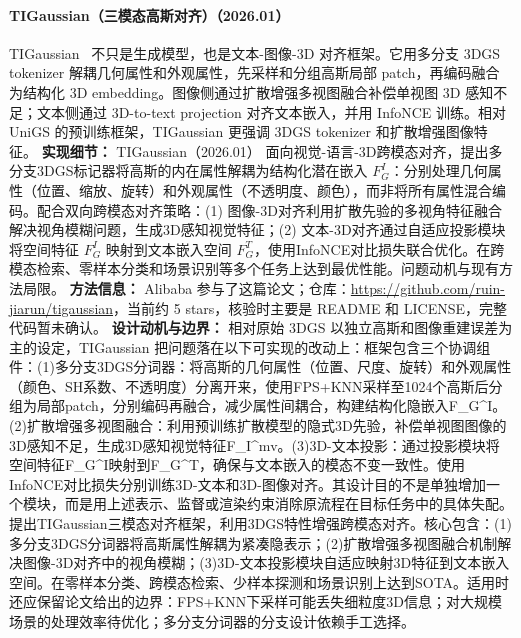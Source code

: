 \paragraph{TIGaussian（三模态高斯对齐）（2026.01）}
TIGaussian~\cite{2601_19247} 不只是生成模型，也是文本-图像-3D 对齐框架。它用多分支 3DGS tokenizer 解耦几何属性和外观属性，先采样和分组高斯局部 patch，再编码融合为结构化 3D embedding。图像侧通过扩散增强多视图融合补偿单视图 3D 感知不足；文本侧通过 3D-to-text projection 对齐文本嵌入，并用 InfoNCE 训练。相对 UniGS 的预训练框架，TIGaussian 更强调 3DGS tokenizer 和扩散增强图像特征。
\textbf{实现细节：} TIGaussian（2026.01） 面向视觉-语言-3D跨模态对齐，提出多分支3DGS标记器将高斯的内在属性解耦为结构化潜在嵌入 $F_G^I$：分别处理几何属性（位置、缩放、旋转）和外观属性（不透明度、颜色），而非将所有属性混合编码。配合双向跨模态对齐策略：(1) 图像-3D对齐利用扩散先验的多视角特征融合解决视角模糊问题，生成3D感知视觉特征；(2) 文本-3D对齐通过自适应投影模块将空间特征 $F_G^I$ 映射到文本嵌入空间 $F_G^T$，使用InfoNCE对比损失联合优化。在跨模态检索、零样本分类和场景识别等多个任务上达到最优性能。问题动机与现有方法局限。
\textbf{方法信息：} Alibaba 参与了这篇论文；仓库：\url{https://github.com/ruin-jiarun/tigaussian}，当前约 5 stars，核验时主要是 README 和 LICENSE，完整代码暂未确认。
\textbf{设计动机与边界：} 相对原始 3DGS 以独立高斯和图像重建误差为主的设定，TIGaussian 把问题落在以下可实现的改动上：框架包含三个协调组件：(1)多分支3DGS分词器：将高斯的几何属性（位置、尺度、旋转）和外观属性（颜色、SH系数、不透明度）分离开来，使用FPS+KNN采样至1024个高斯后分组为局部patch，分别编码再融合，减少属性间耦合，构建结构化隐嵌入F\_G\^{}I。(2)扩散增强多视图融合：利用预训练扩散模型的隐式3D先验，补偿单视图图像的3D感知不足，生成3D感知视觉特征F\_I\^{}mv。(3)3D-文本投影：通过投影模块将空间特征F\_G\^{}I映射到F\_G\^{}T，确保与文本嵌入的模态不变一致性。使用InfoNCE对比损失分别训练3D-文本和3D-图像对齐。其设计目的不是单独增加一个模块，而是用上述表示、监督或渲染约束消除原流程在目标任务中的具体失配。提出TIGaussian三模态对齐框架，利用3DGS特性增强跨模态对齐。核心包含：(1)多分支3DGS分词器将高斯属性解耦为紧凑隐表示；(2)扩散增强多视图融合机制解决图像-3D对齐中的视角模糊；(3)3D-文本投影模块自适应映射3D特征到文本嵌入空间。在零样本分类、跨模态检索、少样本探测和场景识别上达到SOTA。适用时还应保留论文给出的边界：FPS+KNN下采样可能丢失细粒度3D信息；对大规模场景的处理效率待优化；多分支分词器的分支设计依赖手工选择。
